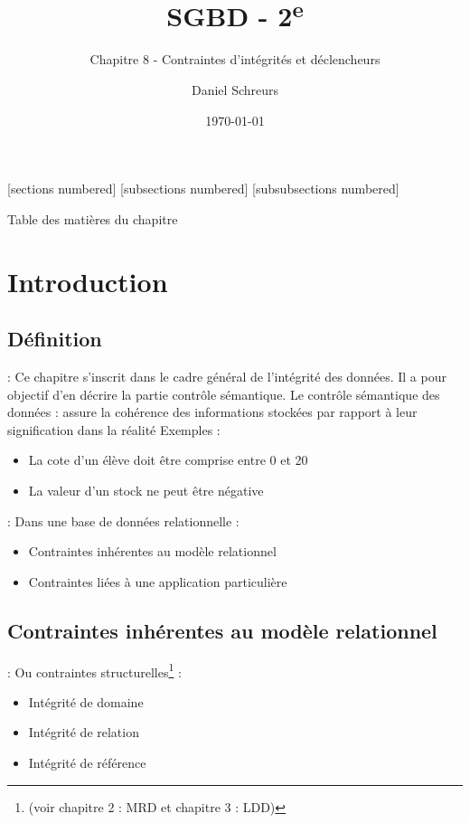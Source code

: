 \documentclass[10pt]{beamer}
\title{SGBD - 2\textsuperscript{e}}
\subtitle{Chapitre 8 - Contraintes d'intégrités et déclencheurs}
\date{\today}
\author{Daniel Schreurs}
\institute{Haute École de Province de Liège}
\begin{document}
\maketitle

[sections numbered]
[subsections numbered]
[subsubsections numbered]
\begin{frame}[allowframebreaks]{Table des matières du chapitre}
    \tableofcontents[subsectionstyle=show/show/hide,subsubsectionstyle=show/show/hide,]
\end{frame}

\section{Introduction}
\tocss
\subsection{Définition}
\begin{frame}{\secname : \subsecname}
    Ce chapitre s'inscrit dans le cadre général de l'intégrité des données.  Il a pour objectif d'en décrire la partie contrôle sémantique.
    Le contrôle sémantique des données : assure la cohérence des informations stockées par rapport à leur signification dans la réalité
    Exemples :
    \begin{itemize}
        \item La cote d'un élève doit être comprise entre 0 et 20
        \item La valeur d'un stock ne peut être négative
    \end{itemize}
\end{frame}

\begin{frame}{\secname : \subsecname}
    Dans une base de données relationnelle :
    \begin{itemize}
        \item Contraintes inhérentes au modèle relationnel
        \item Contraintes liées à une application particulière
    \end{itemize}
\end{frame}

\subsection{Contraintes inhérentes au modèle relationnel}
\begin{frame}{\secname : \subsecname}
    Ou contraintes structurelles\footnote{(voir chapitre 2  : MRD et chapitre 3 : LDD)
    } :
    \begin{itemize}
        \item Intégrité de domaine
        \item Intégrité de relation
        \item Intégrité de référence
    \end{itemize}
\end{frame}
\end{document}
